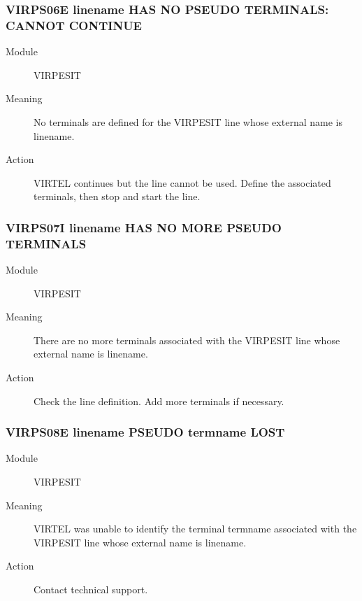 \documentclass[letterpaper,10pt,english]{sphinxmanual}
\begin{document}
\subsubsection{VIRPS06E linename HAS NO PSEUDO TERMINALS: CANNOT CONTINUE}
\label{\detokenize{messages:virps06e-linename-has-no-pseudo-terminals-cannot-continue}}\begin{description}
\item[{Module}] \leavevmode
VIRPESIT

\item[{Meaning}] \leavevmode
No terminals are defined for the VIRPESIT line whose external name is linename.

\item[{Action}] \leavevmode
VIRTEL continues but the line cannot be used. Define the associated terminals, then stop and start the line.

\end{description}


\subsubsection{VIRPS07I linename HAS NO MORE PSEUDO TERMINALS}
\label{\detokenize{messages:virps07i-linename-has-no-more-pseudo-terminals}}\begin{description}
\item[{Module}] \leavevmode
VIRPESIT

\item[{Meaning}] \leavevmode
There are no more terminals associated with the VIRPESIT line whose external name is linename.

\item[{Action}] \leavevmode
Check the line definition. Add more terminals if necessary.

\end{description}


\subsubsection{VIRPS08E linename PSEUDO termname LOST}
\label{\detokenize{messages:virps08e-linename-pseudo-termname-lost}}\begin{description}
\item[{Module}] \leavevmode
VIRPESIT

\item[{Meaning}] \leavevmode
VIRTEL was unable to identify the terminal termname associated with the VIRPESIT line whose external name is linename.

\item[{Action}] \leavevmode
Contact technical support.

\end{description}
\end{document}
